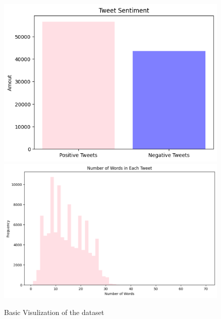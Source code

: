 \documentclass[11pt,a4paper]{article}
\begin{document}
\begin{figure}[h]
\caption{Basic Visulization of the dataset}
\label{sentiment}
\includegraphics[scale=0.38]{output}
\includegraphics[scale=0.3]{numberofwords}
\centering
\end{figure}
\end{document}
